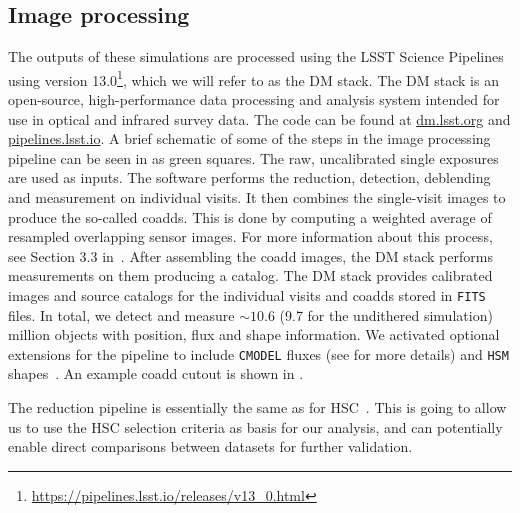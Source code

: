 \documentclass[\docopts]{\docclass}
\begin{document}
\subsection{Image processing}
\label{sec:image_processing_pipeline}

The outputs of these simulations are processed using the LSST Science Pipelines~\citep{Overview,ScienceBook,WhitePaper,2015arXiv151207914J,2018PASJ...70S...5B} using version 13.0\footnote{\url{https://pipelines.lsst.io/releases/v13_0.html}}, which we will refer to as the DM stack. The DM stack is an open-source, high-performance data processing and analysis system intended for use in optical and infrared survey data. The code can be found at \url{dm.lsst.org} and \url{pipelines.lsst.io}. A brief schematic of some of the steps in the image processing pipeline can be seen in  as green squares. The raw, uncalibrated single exposures are used as inputs. The software performs the reduction, detection, deblending and measurement on individual visits. It then combines the single-visit images to produce the so-called coadds. This is done by computing a weighted average of resampled overlapping sensor images. For more information about this process, see Section 3.3 in~\citet{2018PASJ...70S...5B}. After assembling the coadd images, the DM stack performs measurements on them producing a catalog. The DM stack provides calibrated images and source catalogs for the individual visits and coadds stored in \texttt{FITS} files. In total, we detect and measure $\sim 10.6$ (9.7 for the undithered simulation) million objects with position, flux and shape information. We activated optional extensions for the pipeline to include \texttt{CMODEL} fluxes (see \cite{2018PASJ...70S...5B} for more details) and \texttt{HSM} shapes~\citep{2003MNRAS.343..459H,2005MNRAS.361.1287M}. An example coadd cutout is shown in .

The reduction pipeline is essentially the same as for HSC~\citep{2018PASJ...70S...5B}. This is going to allow us to use the HSC selection criteria as basis for our analysis, and can potentially enable direct comparisons between datasets for further validation.
\end{document}
